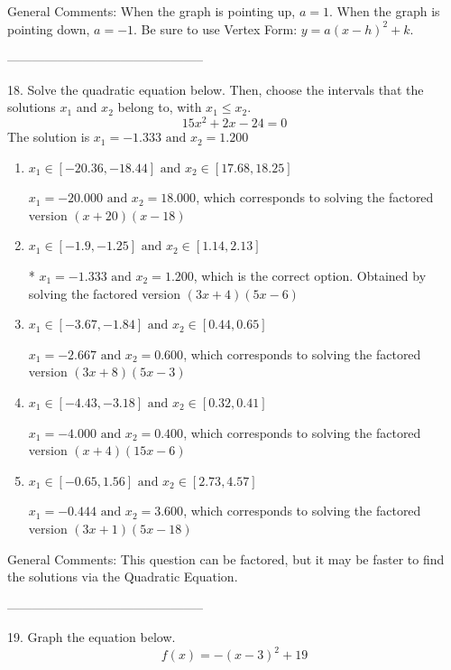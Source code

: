 \documentclass{article}[14pt]
\begin{document}
General Comments: When the graph is pointing up, $a=1$. When the graph is pointing down, $a=-1$. Be sure to use Vertex Form: $y = a(x-h)^2+k$.

-----------------------------------------------

18. Solve the quadratic equation below. Then, choose the intervals that the solutions $x_1$ and $x_2$ belong to, with $x_1 \leq x_2$.
$$ 15x^{2} +2 x -24 = 0 $$ 
The solution is $ x_1 = -1.333 \text{ and } x_2 = 1.200 $ 

\begin{enumerate}[label=\Alph*.] 
\item $ x_1 \in [-20.36, -18.44] \text{ and } x_2 \in [17.68, 18.25] $ 

 $x_1 = -20.000 \text{ and } x_2 = 18.000$, which corresponds to solving the factored version $(x + 20)(x -18)$ 
\item $ x_1 \in [-1.9, -1.25] \text{ and } x_2 \in [1.14, 2.13] $ 

 * $x_1 = -1.333 \text{ and } x_2 = 1.200$, which is the correct option. Obtained by solving the factored version $(3x + 4)(5x -6)$ 
\item $ x_1 \in [-3.67, -1.84] \text{ and } x_2 \in [0.44, 0.65] $ 

 $x_1 = -2.667 \text{ and } x_2 = 0.600$, which corresponds to solving the factored version $(3x + 8)(5x -3)$ 
\item $ x_1 \in [-4.43, -3.18] \text{ and } x_2 \in [0.32, 0.41] $ 

 $x_1 = -4.000 \text{ and } x_2 = 0.400$, which corresponds to solving the factored version $(x + 4)(15x -6)$ 
\item $ x_1 \in [-0.65, 1.56] \text{ and } x_2 \in [2.73, 4.57] $ 

 $x_1 = -0.444 \text{ and } x_2 = 3.600$, which corresponds to solving the factored version $(3x + 1)(5x -18)$ 
\end{enumerate} 
 
General Comments: This question can be factored, but it may be faster to find the solutions via the Quadratic Equation.

-----------------------------------------------

19. Graph the equation below.
$$ f(x) = -(x-3)^2 + 19 $$ 
\end{document}
